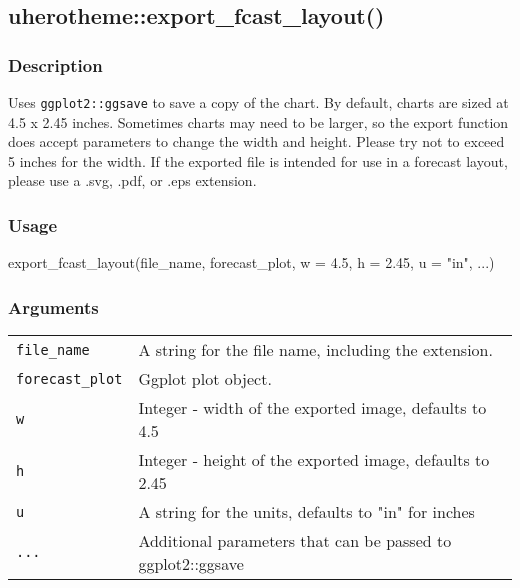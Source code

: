 \documentclass[
  letterpaper,
  DIV=11,
  numbers=noendperiod]{scrreport}
\newenvironment{Shaded}{\begin{snugshade}}{\end{snugshade}}
\newcommand{\AttributeTok}[1]{\textcolor[rgb]{0.40,0.45,0.13}{#1}}
\newcommand{\FloatTok}[1]{\textcolor[rgb]{0.68,0.00,0.00}{#1}}
\newcommand{\FunctionTok}[1]{\textcolor[rgb]{0.28,0.35,0.67}{#1}}
\newcommand{\NormalTok}[1]{\textcolor[rgb]{0.00,0.23,0.31}{#1}}
\newcommand{\StringTok}[1]{\textcolor[rgb]{0.13,0.47,0.30}{#1}}
\begin{document}
\subsection{uherotheme::export\_fcast\_layout()}\label{uherothemeexport_fcast_layout}

\subsubsection{Description}\label{description-79}

Uses \texttt{ggplot2::ggsave} to save a copy of the chart. By default,
charts are sized at 4.5 x 2.45 inches. Sometimes charts may need to be
larger, so the export function does accept parameters to change the
width and height. Please try not to exceed 5 inches for the width. If
the exported file is intended for use in a forecast layout, please use a
\textquotesingle.svg\textquotesingle,
\textquotesingle.pdf\textquotesingle, or
\textquotesingle.eps\textquotesingle{} extension.

\subsubsection{Usage}\label{usage-79}

\begin{Shaded}
\begin{Highlighting}[]
\FunctionTok{export\_fcast\_layout}\NormalTok{(file\_name, forecast\_plot, }\AttributeTok{w =} \FloatTok{4.5}\NormalTok{, }\AttributeTok{h =} \FloatTok{2.45}\NormalTok{, }\AttributeTok{u =} \StringTok{"in"}\NormalTok{, ...)}
\end{Highlighting}
\end{Shaded}

\subsubsection{Arguments}\label{arguments-79}

\begin{longtable}[]{@{}ll@{}}
\toprule\noalign{}
\endhead
\bottomrule\noalign{}
\endlastfoot
\texttt{file\_name} & A string for the file name, including the
extension. \\
\texttt{forecast\_plot} & Ggplot plot object. \\
\texttt{w} & Integer - width of the exported image, defaults to 4.5 \\
\texttt{h} & Integer - height of the exported image, defaults to 2.45 \\
\texttt{u} & A string for the units, defaults to "in" for inches \\
\texttt{...} & Additional parameters that can be passed to
ggplot2::ggsave \\
\end{longtable}
\end{document}
